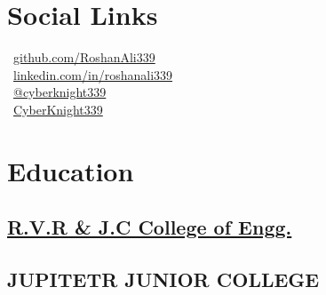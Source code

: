 \documentclass[]{roshan-resume}
\begin{document}
	
	
	
	
	\begin{minipage}[t]{0.33\textwidth} 
		
		
		\section{Social Links} 
		\faGithub \ \href{https://github.com/RoshanAli339}{github.com/RoshanAli339} \\
		\faLinkedinIn \  \href{https://www.linkedin.com/in/roshanali339/}{linkedin.com/in/roshanali339} \\
		\faYoutube \ \href{https://www.youtube.com/@cyberknight339}{@cyberknight339} \\
		\faMediumM \ \href{https://cyberknight339.medium.com}{CyberKnight339}
		
		
		\section{Education} 
		
		\subsection{\href{https://rvrjcce.ac.in/}{R.V.R \& J.C College of Engg.}}
		\sectionsep
		
		\subsection{JUPITETR JUNIOR COLLEGE}
		\sectionsep
		

\end{minipage}
\end{document}

